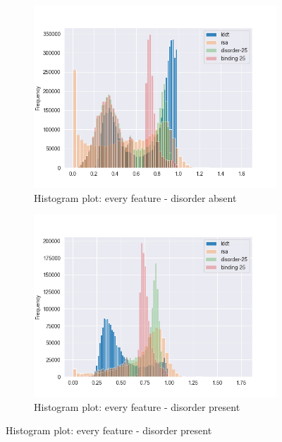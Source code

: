 \begin{figure}[h!]
    \begin{subfigure}{0.6\linewidth}
        \includegraphics[width=\linewidth]{res/analysis/plots/dis0-histplot_all.png}
        \caption{Histogram plot: every feature - disorder absent}
    \end{subfigure}
    \vfill
    \begin{subfigure}{0.6\linewidth}
        \includegraphics[width=\linewidth]{res/analysis/plots/dis1-histplot_all.png}
        \caption{Histogram plot: every feature - disorder present}
    \end{subfigure}
    \vfill
\end{figure}
